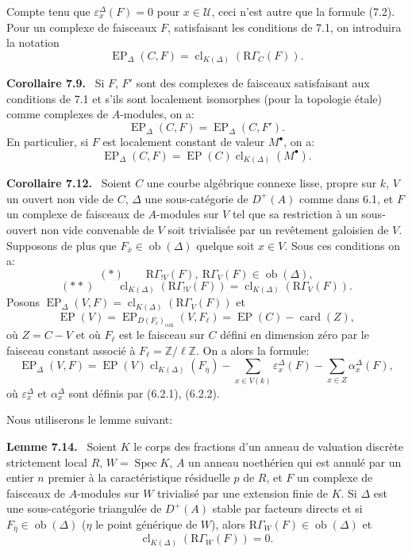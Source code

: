 \documentclass[11pt]{article}
\newenvironment{statement}[1]{\par\medskip\noindent\textbf{#1.}\ }{\par\medskip}
\DeclareMathOperator{\Spec}{Spec}
\newcommand{\R}{\mathrm{R}}\newcommand{\RHomCore}{\mathrm{RHom}}
\providecommand{\EP}{\operatorname{EP}}
\providecommand{\coh}{\mathrm{coh}}
\providecommand{\Ob}{\operatorname{ob}}
\providecommand{\Ob}{\operatorname{ob}}
\providecommand{\R}{\mathrm R}
\providecommand{\Spec}{\operatorname{Spec}}
\providecommand{\EP}{\operatorname{EP}}
\providecommand{\Spec}{\operatorname{Spec}}
\providecommand{\Ob}{\operatorname{Ob}}
\providecommand{\coh}{\mathrm{coh}}
\providecommand{\clK}[1]{\operatorname{cl}_{K(#1)}}
\providecommand{\RG}{\R\Gamma}
\providecommand{\Spec}{\operatorname{Spec}}
\providecommand{\Ob}{\operatorname{ob}}
\providecommand{\Spec}{\operatorname{Spec}}
\providecommand{\Ob}{\operatorname{Ob}}
\begin{document}
Compte tenu que $\varepsilon_x^\Delta(F)=0$ pour $x\in\mathcal U$, ceci n'est autre que la formule (7.2). Pour un complexe de faisceaux $F$, satisfaisant les conditions de 7.1, on introduira la notation
\[
\EP_\Delta(C,F)=\clK{\Delta}(\RG_C(F)).
\]

\begin{statement}{Corollaire 7.9}
Si $F$, $F'$ sont des complexes de faisceaux satisfaisant aux conditions de 7.1 et s'ils sont localement isomorphes (pour la topologie étale) comme complexes de $A$-modules, on a:
\[
\EP_\Delta(C,F)=\EP_\Delta(C,F').
\tag{7.10}
\]
En particulier, si $F$ est localement constant de valeur $M^\bullet$, on a:
\[
\EP_\Delta(C,F)=\EP(C)\clK{\Delta}(M^\bullet).
\tag{7.11}
\]
\end{statement}

\begin{statement}{Corollaire 7.12}
Soient $C$ une courbe algébrique connexe lisse, propre sur $k$, $V$ un ouvert non vide de $C$, $\Delta$ une sous-catégorie de $D^+(A)$ comme dans 6.1, et $F$ un complexe de faisceaux de $A$-modules sur $V$ tel que sa restriction à un sous-ouvert non vide convenable de $V$ soit trivialisée par un revêtement galoisien de $V$. Supposons de plus que $F_{\bar x}\in\Ob(\Delta)$ quelque soit $x\in V$. Sous ces conditions on a:
\[
(*)\qquad \RG_{!V}(F),\ \RG_V(F)\in\Ob(\Delta),
\]
\[
(**)\qquad
\clK{\Delta}(\RG_{!V}(F))=\clK{\Delta}(\RG_V(F)).
\]
Posons $\EP_\Delta(V,F)=\clK{\Delta}(\RG_V(F))$ et
\[
\EP(V)=\EP_{D(F_\ell)_{\coh}}(V,F_\ell)=\EP(C)-\operatorname{card}(Z),
\]
où $Z=C-V$ et où $F_\ell$ est le faisceau sur $C$ défini en dimension zéro par le faisceau constant associé à $F_\ell=\mathbb Z/\ell\mathbb Z$. On a alors la formule:
\[
\EP_\Delta(V,F)
=
\EP(V)\clK{\Delta}(F_{\bar\eta})
-\sum_{x\in V(k)}\varepsilon_x^\Delta(F)
-\sum_{x\in Z}\alpha_x^\Delta(F),
\tag{7.13}
\]
où $\varepsilon_x^\Delta$ et $\alpha_x^\Delta$ sont définis par (6.2.1), (6.2.2).
\end{statement}

Nous utiliserons le lemme suivant:

\begin{statement}{Lemme 7.14}
Soient $K$ le corps des fractions d'un anneau de valuation discrète strictement local $R$, $W=\Spec K$, $A$ un anneau noethérien qui est annulé par un entier $n$ premier à la caractéristique résiduelle $p$ de $R$, et $F$ un complexe de faisceaux de $A$-modules sur $W$ trivialisé par une extension finie de $K$. Si $\Delta$ est une sous-catégorie triangulée de $D^+(A)$ stable par facteurs directs et si $F_{\bar\eta}\in\Ob(\Delta)$ ($\eta$ le point générique de $W$), alors $\RG_W(F)\in\Ob(\Delta)$ et
\[
\clK{\Delta}(\RG_W(F))=0.
\]
\end{statement}
\end{document}
